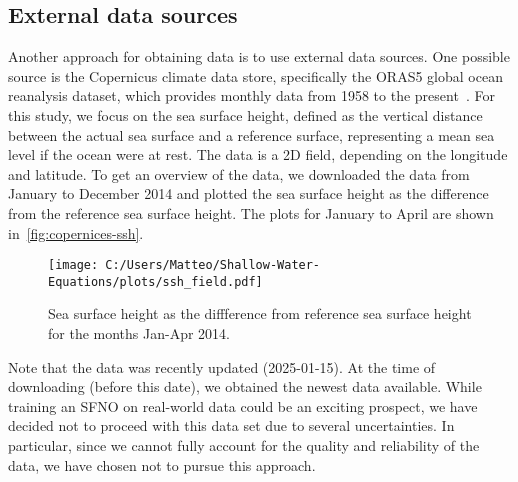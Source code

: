 \subsection*{External data sources}
Another approach for obtaining data is to use external data sources.
One possible source is the Copernicus climate data store, specifically the ORAS5 global ocean reanalysis dataset, which provides monthly data from 1958 to the present~\cite{Copernicus_data}.
For this study, we focus on the sea surface height, defined as the vertical distance between the actual sea surface and a reference surface, representing a mean sea level if the ocean were at rest.
The data is a 2D field, depending on the longitude and latitude.
To get an overview of the data, we downloaded the data from January to December 2014 and plotted the sea surface height as the difference from the reference sea surface height.
The plots for January to April are shown in~\autoref{fig:copernices-ssh}.
\begin{figure}[H]
    \centering
    \texttt{[image: C:/Users/Matteo/Shallow-Water-Equations/plots/ssh\_field.pdf]}
    \caption{Sea surface height as the diffference from reference sea surface height for the months Jan-Apr 2014.}\label{fig:copernices-ssh}
\end{figure}
Note that the data was recently updated (2025-01-15).
At the time of downloading (before this date), we obtained the newest data available.
While training an SFNO on real-world data could be an exciting prospect, we have decided not to proceed with this data set due to several uncertainties.
In particular, since we cannot fully account for the quality and reliability of the data, we have chosen not to pursue this approach.

